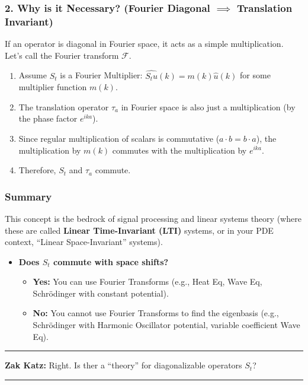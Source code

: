 \documentclass[oneside]{book}
\begin{document}
\subsubsection*{2. Why is it Necessary? (Fourier Diagonal $\implies$ Translation Invariant)}
If an operator is diagonal in Fourier space, it acts as a simple multiplication. Let's call the Fourier transform $\mathcal{F}$.

\begin{enumerate}
    \item Assume $S_t$ is a Fourier Multiplier: $\widehat{S_t u}(k) = m(k) \widehat{u}(k)$ for some multiplier function $m(k)$.
    \item The translation operator $\tau_a$ in Fourier space is also just a multiplication (by the phase factor $e^{ika}$).
    \item Since regular multiplication of scalars is commutative ($a \cdot b = b \cdot a$), the multiplication by $m(k)$ commutes with the multiplication by $e^{ika}$.
    \item Therefore, $S_t$ and $\tau_a$ commute.
\end{enumerate}

\subsubsection*{Summary}
This concept is the bedrock of signal processing and linear systems theory (where these are called \textbf{Linear Time-Invariant (LTI)} systems, or in your PDE context, ``Linear Space-Invariant'' systems).

\begin{itemize}
    \item \textbf{Does $S_t$ commute with space shifts?}
    \begin{itemize}
        \item \textbf{Yes:} You can use Fourier Transforms (e.g., Heat Eq, Wave Eq, Schrödinger with constant potential).
        \item \textbf{No:} You cannot use Fourier Transforms to find the eigenbasis (e.g., Schrödinger with Harmonic Oscillator potential, variable coefficient Wave Eq).
    \end{itemize}
\end{itemize}

\noindent\rule{\textwidth}{0.4pt}

\noindent \textbf{Zak Katz:} Right. Is ther a ``theory'' for diagonalizable operators $S_t$?

\noindent\rule{\textwidth}{0.4pt}
\end{document}
